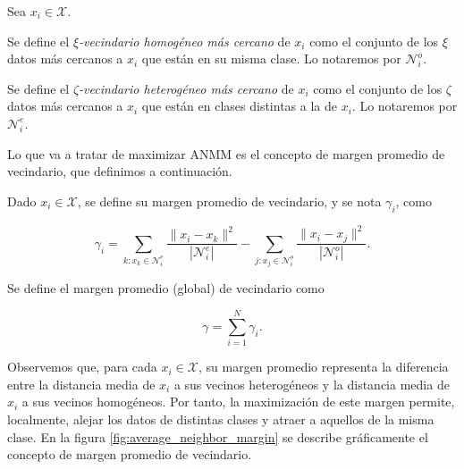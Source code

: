 \begin{definition}
    Sea $x_i \in \mathcal{X}$.
    
    Se define el \emph{$\xi$-vecindario homogéneo más cercano} de $x_i$ como el conjunto de los $\xi$ datos más cercanos a $x_i$ que están en su misma clase. Lo notaremos por $\mathcal{N}_i^o$.
    
    Se define el \emph{$\zeta$-vecindario heterogéneo más cercano} de $x_i$ como el conjunto de los $\zeta$ datos más cercanos a $x_i$ que están en clases distintas a la de $x_i$. Lo notaremos por $\mathcal{N}_i^e$.
\end{definition} 

Lo que va a tratar de maximizar ANMM es el concepto de margen promedio de vecindario, que definimos a continuación.

\begin{definition}
    Dado $x_i \in \mathcal{X}$, se define su margen promedio de vecindario, y se nota $\gamma_i$, como
    
    \begin{equation}
        \gamma_i = \sum\limits_{k \colon x_k \in \mathcal{N}_i^e} \frac{\|x_i - x_k \|^2}{|\mathcal{N}_i^e|} - \sum\limits_{j \colon x_j \in \mathcal{N}_i^o} \frac{\|x_i - x_j \|^2}{|\mathcal{N}_i^o|}.
    \end{equation}
    
    Se define el margen promedio (global) de vecindario como
    
    \begin{equation}
        \gamma = \sum_{i=1}^N \gamma_i.
    \end{equation}

    
\end{definition}

Observemos que, para cada $x_i \in \mathcal{X}$, su margen promedio representa la diferencia entre la distancia media de $x_i$ a sus vecinos heterogéneos y la distancia media de $x_i$ a sus vecinos homogéneos. Por tanto, la maximización de este margen permite, localmente, alejar los datos de distintas clases y atraer a aquellos de la misma clase. En la figura \ref{fig:average_neighbor_margin} se describe gráficamente el concepto de margen promedio de vecindario.

